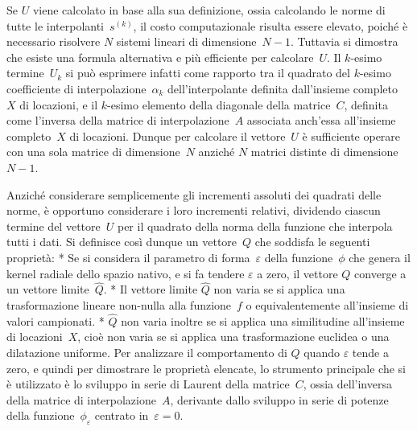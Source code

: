 Se $U$ viene calcolato in base alla sua definizione, ossia calcolando le norme di tutte le interpolanti~$s^{(k)}$, il costo computazionale risulta essere elevato, poiché è necessario risolvere $N$ sistemi lineari di dimensione~$N{-}1$.
Tuttavia si dimostra che esiste una formula alternativa e più efficiente per calcolare~$U$.  Il $k$-esimo termine~$U_k$ si può esprimere infatti come rapporto tra il quadrato del $k$-esimo coefficiente di interpolazione~$\alpha_k$ dell’interpolante definita dall’insieme completo~$X$ di locazioni, e il $k$-esimo elemento della diagonale della matrice~$C$, definita come l’inversa della matrice di interpolazione~$A$ associata anch’essa all’insieme completo~$X$ di locazioni.  Dunque per calcolare il vettore~$U$ è sufficiente operare con una sola matrice di dimensione~$N$ anziché $N$ matrici distinte di dimensione~$N{-}1$. 


Anziché considerare semplicemente gli incrementi assoluti dei quadrati delle norme, è opportuno considerare i loro incrementi relativi, dividendo ciascun termine del vettore~$U$ per il quadrato della norma della funzione che interpola tutti i dati.  Si definisce così dunque un vettore~$Q$ che soddisfa le seguenti proprietà:
\begitems
* Se si considera il parametro di forma~$\varepsilon$ della funzione~$\phi$ che genera il kernel radiale dello spazio nativo, e si fa tendere $\varepsilon$ a zero, il vettore $Q$ converge a un vettore limite~$\hat Q$.
* Il vettore limite $\hat Q$ non varia se si applica una trasformazione lineare non-nulla alla funzione~$f$ o equivalentemente all’insieme di valori campionati.
* $\hat Q$ non varia inoltre se si applica una similitudine all’insieme di locazioni~$X$, cioè non varia se si applica una trasformazione euclidea o una dilatazione uniforme.
\enditems
Per analizzare il comportamento di $Q$ quando $\varepsilon$ tende a zero, e quindi per dimostrare le proprietà elencate, lo strumento principale che si è utilizzato è lo sviluppo in serie di Laurent della matrice~$C$, ossia dell’inversa della matrice di interpolazione~$A$, derivante dallo sviluppo in serie di potenze della funzione~$\phi_\varepsilon$ centrato in~$\varepsilon = 0$.




